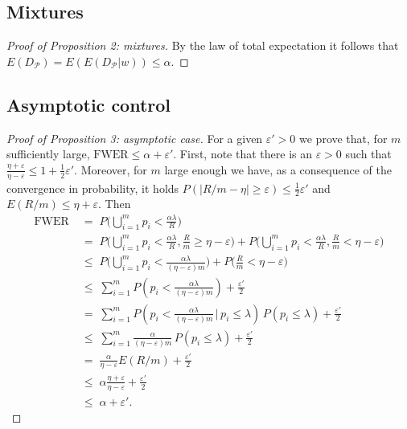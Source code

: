 \documentclass {imsart}
\newcommand{\FWER}{\text{$\mathrm{FWER}$}}
\renewcommand{\P}{\mathcal{P}}
\begin{document}
\subsection{Mixtures}
\begin{proof}[Proof of Proposition 2: mixtures]
By the law of total expectation it follows that $E(D_{\P}) = E(E(D_{\P}|w)) \leq \alpha$.
\end{proof}


\subsection{Asymptotic control}
\begin{proof}[Proof of Proposition 3: asymptotic case]
For a given $\varepsilon '>0$ we prove that, for $m$ sufficiently large, $\FWER\le\alpha+\varepsilon '$. First, note that there is an $\varepsilon >0$ such that
$\frac{\eta +\varepsilon}{\eta -\varepsilon }\le 1+\tfrac{1}{2}\varepsilon'$. Moreover, for $m$ large enough we have, as a consequence of the convergence in probability, it holds $P(|R/m-\eta|\ge\varepsilon)\le\tfrac{1}{2}\varepsilon'$ and $E(R/m)\le\eta+\varepsilon$. Then
\begin{align*}
\FWER&\;=\;P\Big(\textstyle\bigcup\limits_{i=1}^{m}{p_i<\frac{\alpha \lambda }{R}}\Big) \\
&\;=\;P\Big(\textstyle\bigcup\limits_{i=1}^{m}{p_i<\frac{\alpha\lambda}{R}},\frac{R}{m}\ge\eta-\varepsilon\Big)
+P\Big(\textstyle\bigcup\limits_{i=1}^{m}{p_i<\frac{\alpha\lambda}{R}},\frac{R}{m}<\eta-\varepsilon\Big)\\
&\;\le\;P\Big(\textstyle\bigcup\limits_{i=1}^{m}{p_i<\frac{\alpha\lambda}{(\eta-\varepsilon )m}}\Big)+P\big(\frac{R}{m}<\eta -\varepsilon\big) \\
&\;\le\; \sum\limits_{i=1}^{m}{P(p_i<\tfrac{\alpha \lambda }{(\eta -\varepsilon )m})}+\frac{\varepsilon '}{2} \\
&\;=\;\sum\limits_{i=1}^{m}{P(p_i<\tfrac{\alpha \lambda }{(\eta -\varepsilon )m}\,|\,p_i\le \lambda )}\,P(p_i\le \lambda )+\frac{\varepsilon '}{2} \\
&\;\le\; \sum\limits_{i=1}^{m}{\frac{\alpha }{(\eta -\varepsilon )m}}\,P(p_i\le \lambda )+\frac{\varepsilon '}{2} \\
&\;=\; \frac{\alpha }{\eta -\varepsilon }E(R/m)+\frac{\varepsilon '}{2} \\
&\;\le\; \alpha\frac{\eta +\varepsilon }{\eta -\varepsilon }+\frac{\varepsilon '}{2} \\
&\;\le\; \alpha+\varepsilon'.
\end{align*}
\end{proof}
\end{document}
